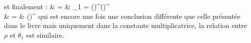 \eenn
et finalement :
\bea
	\sigma & = & \lvert {} \rvert {}\omega_{1} = \left(\right)^{}\left(\right)^{} \nonumber \\
	& = & \left(\right)^{} \nonumber
\eea
qui est encore une fois une conclusion diff\'erente que celle pr\'esent\'ee dans le livre mais uniquement dans la constante multiplicatrice, la relation entre $\rho$ et $\theta_{1}$ est similaire.